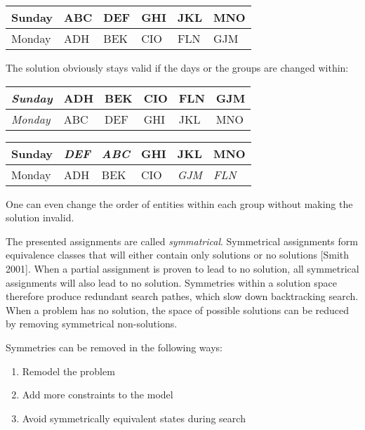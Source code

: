 \documentclass[a4paper]{scrartcl}
\begin{document}
\begin{table}[h]
\centering
\begin{tabular}{| l | l | l | l| l | l |}
\hline
Sunday & ABC & DEF & GHI & JKL & MNO \\
\hline
Monday & ADH  & BEK & CIO & FLN & GJM \\
\hline
\end{tabular}
\end{table}

The solution obviously stays valid if the days or the groups are changed within:

\begin{table}[h]
\centering
\begin{tabular}{| l | l | l | l| l | l |}
\hline
\emph{Sunday} & ADH  & BEK & CIO & FLN & GJM \\
\hline
\emph{Monday} & ABC & DEF & GHI & JKL & MNO \\
\hline
\end{tabular}
\end{table}

\begin{table}[h]
\centering
\begin{tabular}{| l | l | l | l| l | l |}
\hline
Sunday & \emph{DEF} & \emph{ABC} & GHI & JKL & MNO \\
\hline
Monday & ADH  & BEK & CIO & \emph{GJM} & \emph{FLN}\\
\hline
\end{tabular}
\end{table}

One can even change the order of entities within each group without making the solution invalid.

The presented assignments are called \emph{symmatrical}. Symmetrical assignments form equivalence classes that will either contain only solutions or no solutions [Smith 2001]. When a partial assignment is proven to lead to no solution, all symmetrical assignments will also lead to no solution. Symmetries within a solution space therefore produce redundant search pathes, which slow down backtracking search. When a problem has no solution, the space of possible solutions can be reduced by removing symmetrical non-solutions.

Symmetries can be removed in the following ways:

\begin{enumerate}
\item Remodel the problem
\item Add more constraints to the model
\item Avoid symmetrically equivalent states during search
\end{enumerate}
\end{document}
